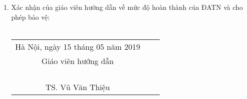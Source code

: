 \begin{dedication}
\begin{enumerate}
  \item Xác nhận của giáo viên hướng dẫn về mức độ hoàn thành của ĐATN và cho phép bảo vệ:\\
  	\\
		\begin{tabu} {c c c}
  	
  		 	\hspace{60mm} Hà Nội, ngày 15 tháng 05 năm 2019\\
  			\hspace{70mm} Giáo viên hướng dẫn\\
  			\\
  			\\
  			\\
  			\\
  			\hspace{70mm} TS. Vũ Văn Thiệu\\
  	
  	
  		\end{tabu}

  \end{enumerate}
	  
  
\end{dedication}